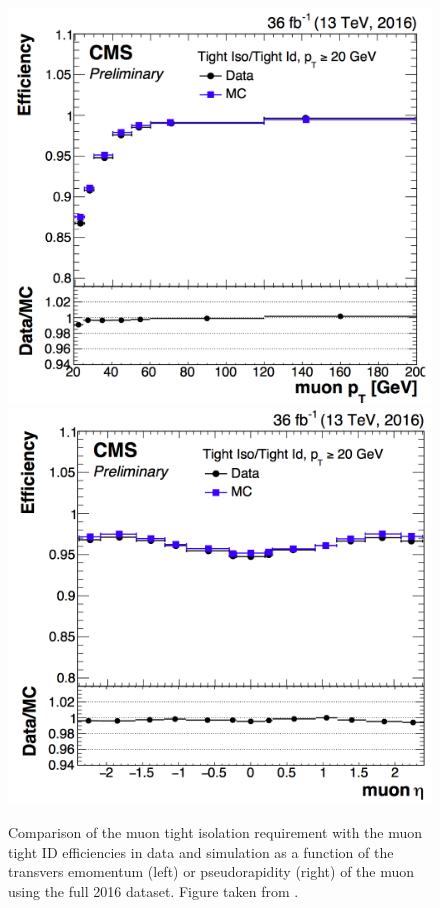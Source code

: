 \begin{figure}[htbp]
	\centering
	\includegraphics[width=0.494\linewidth]{4_EventRecoSelect/Figures/TightIsovsot}
	\includegraphics[width=0.494\linewidth]{4_EventRecoSelect/Figures/TightIsovseta}
	\caption{Comparison of the muon tight isolation requirement with the muon tight ID  efficiencies in data and simulation as a function of the transvers emomentum (left) or  pseudorapidity (right) of the muon using the full 2016 dataset. Figure taken from \cite{CMS-DP-2017-007}.}
	\label{fig:muoniso}
\end{figure}

